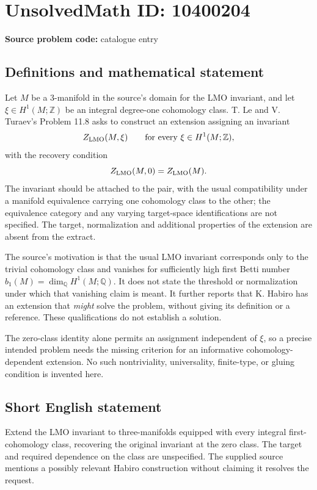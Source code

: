 \documentclass[11pt]{article}
\newcommand{\Z}{\mathbb{Z}}
\newcommand{\Q}{\mathbb{Q}}
\begin{document}
\section*{UnsolvedMath ID: 10400204}
\textbf{Source problem code:} catalogue entry
\subsection{Definitions and mathematical statement}
Let \(M\) be a \(3\)-manifold in the source's domain for the LMO invariant, and let \(\xi\in H^1(M;\Z)\) be an integral degree-one cohomology class. T. Le and V. Turaev's Problem 11.8 asks to construct an extension assigning an invariant
\[
 Z_{\rm LMO}(M,\xi)
 \qquad\text{for every }\xi\in H^1(M;\Z),
\]
with the recovery condition
\[
 Z_{\rm LMO}(M,0)=Z_{\rm LMO}(M).
\]
The invariant should be attached to the pair, with the usual compatibility under a manifold equivalence carrying one cohomology class to the other; the equivalence category and any varying target-space identifications are not specified. The target, normalization and additional properties of the extension are absent from the extract.

The source's motivation is that the usual LMO invariant corresponds only to the trivial cohomology class and vanishes for sufficiently high first Betti number \(b_1(M)=\dim_{\Q}H^1(M;\Q)\). It does not state the threshold or normalization under which that vanishing claim is meant. It further reports that K. Habiro has an extension that \emph{might} solve the problem, without giving its definition or a reference. These qualifications do not establish a solution.

The zero-class identity alone permits an assignment independent of \(\xi\), so a precise intended problem needs the missing criterion for an informative cohomology-dependent extension. No such nontriviality, universality, finite-type, or gluing condition is invented here.
\subsection{Short English statement}
Extend the LMO invariant to three-manifolds equipped with every integral first-cohomology class, recovering the original invariant at the zero class. The target and required dependence on the class are unspecified. The supplied source mentions a possibly relevant Habiro construction without claiming it resolves the request.
\end{document}
